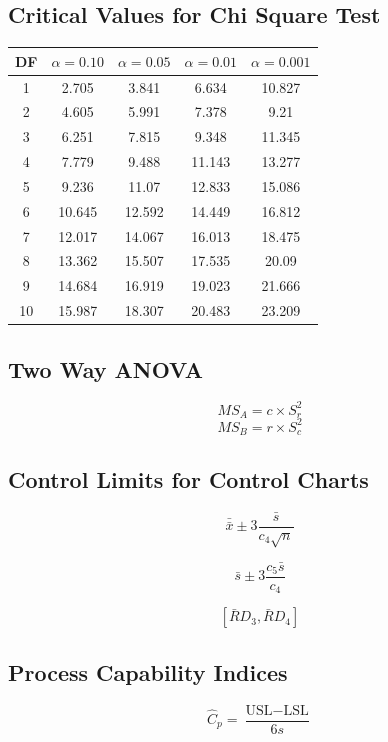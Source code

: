 \documentclass[a4paper,12pt]{article}
\begin{document}
	\subsection*{Critical Values for Chi Square Test}
	{
		\Large
		\begin{center}
			\begin{tabular}{|c|c|c|c|c|}
				\hline 
				DF	&	$\alpha=0.10$	&	$\alpha=0.05$	&	$\alpha=0.01$	&	$\alpha=0.001$	\\ \hline
				1	& 	2.705	&	3.841	&	6.634	&	10.827	\\ \hline
				2	&	4.605	&	5.991	&	7.378	&	9.21	\\ \hline
				3	&	6.251	&	7.815	&	9.348	&	11.345	\\ \hline
				4	&	7.779	&	9.488	&	11.143	&	13.277	\\ \hline
				5	&	9.236	&	11.07	&	12.833	&	15.086	\\ \hline
				6	&	10.645	&	12.592	&	14.449	&	16.812	\\ \hline
				7	&	12.017	&	14.067	&	16.013	&	18.475	\\ \hline
				8	&	13.362	&	15.507	&	17.535	&	20.09	\\ \hline
				9	&	14.684	&	16.919	&	19.023	&	21.666	\\ \hline
				10	&	15.987	&	18.307	&	20.483	&	23.209	\\ \hline
			\end{tabular} 
		\end{center}
	}
\newpage

\subsection*{Two Way ANOVA}
\[MS_A = c \times S^2_r\]
\[MS_B = r \times S^2_c\]

\subsection*{Control Limits for Control Charts}

\[ \bar{\bar{x}} \pm 3\frac{\bar{s}}{c_4\sqrt{n}}\]

\[ \bar{s} \pm 3\frac{c_5\bar{s}}{c_4}\]

\[\left[ \bar{R}D_3, \bar{R}D_4\right]\]

\subsection*{Process Capability Indices}
\[ \hat{C}_p = \frac{\mbox{USL} - \mbox{LSL}}{6s}\]
\end{document}
